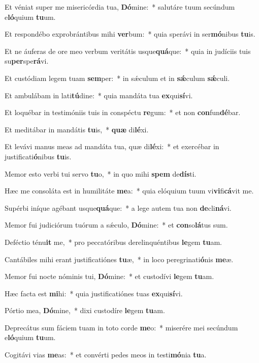 \item Et véniat super me misericórdia tua, \textbf{Dó}mine:~* salutáre tuum secúndum e\textbf{ló}quium \textbf{tu}um.
\item Et respondébo exprobrántibus mihi \textbf{ver}bum:~* quia sperávi in ser\textbf{mó}nibus \textbf{tu}is.
\item Et ne áuferas de ore meo verbum veritátis usque\textbf{quá}que:~* quia in judíciis tuis su\textbf{per}spe\textbf{rá}vi.
\item Et custódiam legem tuam \textbf{sem}per:~* in sǽculum et in \textbf{sǽ}culum \textbf{sǽ}culi.
\item Et ambulábam in lati\textbf{tú}dine:~* quia mandáta tua \textbf{ex}qui\textbf{sí}vi.
\item Et loquébar in testimóniis tuis in conspéctu \textbf{re}gum:~* et non \textbf{con}fun\textbf{dé}bar.
\item Et meditábar in mandátis \textbf{tu}is,~* \textbf{quæ} di\textbf{lé}xi.
\item Et levávi manus meas ad mandáta tua, quæ di\textbf{lé}xi:~* et exercébar in justificati\textbf{ó}nibus \textbf{tu}is.
\item Memor esto verbi tui servo \textbf{tu}o,~* in quo mihi \textbf{spem} de\textbf{dís}ti.
\item Hæc me consoláta est in humilitáte \textbf{me}a:~* quia elóquium tuum vi\textbf{vi}fi\textbf{cá}vit me.
\item Supérbi iníque agébant usque\textbf{quá}que:~* a lege autem tua non \textbf{de}cli\textbf{ná}vi.
\item Memor fui judiciórum tuórum a sǽculo, \textbf{Dó}mine:~* et \textbf{con}so\textbf{lá}tus sum.
\item Deféctio ténu\textbf{it} me,~* pro peccatóribus derelinquéntibus \textbf{le}gem \textbf{tu}am.
\item Cantábiles mihi erant justificatiónes \textbf{tu}æ,~* in loco peregrinati\textbf{ó}nis \textbf{me}æ.
\item Memor fui nocte nóminis tui, \textbf{Dó}mine:~* et custodívi \textbf{le}gem \textbf{tu}am.
\item Hæc facta est \textbf{mi}hi:~* quia justificatiónes tuas \textbf{ex}qui\textbf{sí}vi.
\item Pórtio mea, \textbf{Dó}mine,~* dixi custodíre \textbf{le}gem \textbf{tu}am.
\item Deprecátus sum fáciem tuam in toto corde \textbf{me}o:~* miserére mei secúndum e\textbf{ló}quium \textbf{tu}um.
\item Cogitávi vias \textbf{me}as:~* et convérti pedes meos in testi\textbf{mó}nia \textbf{tu}a.
